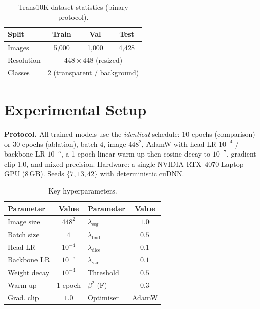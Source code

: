 \documentclass{bmvc2k}
\begin{document}
\begin{table}[t]
\centering
\caption{Trans10K dataset statistics (binary protocol).}
\label{tab:data}
\begin{tabular}{lccc}
\toprule
Split & Train & Val & Test \\
\midrule
Images & 5{,}000 & 1{,}000 & 4{,}428 \\
Resolution & \multicolumn{3}{c}{$448\times448$ (resized)} \\
Classes & \multicolumn{3}{c}{2 (transparent / background)} \\
\bottomrule
\end{tabular}
\end{table}

\section{Experimental Setup}
\textbf{Protocol.} All trained models use the \emph{identical} schedule: $10$
epochs (comparison) or $30$ epochs (ablation), batch $4$, image $448^2$, AdamW
\cite{loshchilov2019adamw} with head LR $10^{-4}$ / backbone LR $10^{-5}$, a
1-epoch linear warm-up then cosine decay \cite{loshchilov2017sgdr} to $10^{-7}$,
gradient clip $1.0$, and mixed precision. Hardware: a single NVIDIA RTX~4070
Laptop GPU (8\,GB). Seeds $\{7,13,42\}$ with deterministic cuDNN.

\begin{table}[t]
\centering
\caption{Key hyperparameters.}
\label{tab:hparams}
\begin{tabular}{lc@{\hskip 1.4em}lc}
\toprule
Parameter & Value & Parameter & Value \\
\midrule
Image size & $448^2$ & $\lambda_{\mathrm{seg}}$ & $1.0$ \\
Batch size & $4$ & $\lambda_{\mathrm{bnd}}$ & $0.5$ \\
Head LR & $10^{-4}$ & $\lambda_{\mathrm{dice}}$ & $0.1$ \\
Backbone LR & $10^{-5}$ & $\lambda_{\mathrm{var}}$ & $0.1$ \\
Weight decay & $10^{-4}$ & Threshold & $0.5$ \\
Warm-up & $1$ epoch & $\beta^2$ (F) & $0.3$ \\
Grad. clip & $1.0$ & Optimiser & AdamW \\
\bottomrule
\end{tabular}
\end{table}
\end{document}
